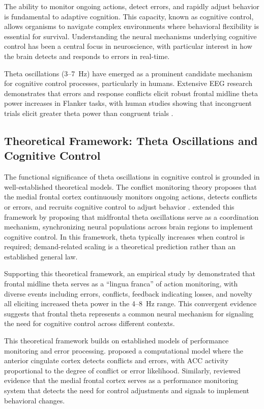 \documentclass[11pt]{article}
\begin{document}
The ability to monitor ongoing actions, detect errors, and rapidly adjust behavior is fundamental to adaptive cognition. This capacity, known as cognitive control, allows organisms to navigate complex environments where behavioral flexibility is essential for survival. Understanding the neural mechanisms underlying cognitive control has been a central focus in neuroscience, with particular interest in how the brain detects and responds to errors in real-time.

Theta oscillations (3--7~Hz) have emerged as a prominent candidate mechanism for cognitive control processes, particularly in humans. Extensive EEG research demonstrates that errors and response conflicts elicit robust frontal midline theta power increases in Flanker tasks, with human studies showing that incongruent trials elicit greater theta power than congruent trials \citep{linton2024behavioral}.

\subsection{Theoretical Framework: Theta Oscillations and Cognitive Control}

The functional significance of theta oscillations in cognitive control is grounded in well-established theoretical models. The conflict monitoring theory proposes that the medial frontal cortex continuously monitors ongoing actions, detects conflicts or errors, and recruits cognitive control to adjust behavior \citep{botvinick2001conflict, yeung2004neural}. \citet{cavanagh2014frontal} extended this framework by proposing that midfrontal theta oscillations serve as a coordination mechanism, synchronizing neural populations across brain regions to implement cognitive control. In this framework, theta typically increases when control is required; demand-related scaling is a theoretical prediction rather than an established general law.

Supporting this theoretical framework, an empirical study by \citet{cavanagh2012theta} demonstrated that frontal midline theta serves as a ``lingua franca'' of action monitoring, with diverse events including errors, conflicts, feedback indicating losses, and novelty all eliciting increased theta power in the 4--8~Hz range. This convergent evidence suggests that frontal theta represents a common neural mechanism for signaling the need for cognitive control across different contexts.

This theoretical framework builds on established models of performance monitoring and error processing. \citet{yeung2004neural} proposed a computational model where the anterior cingulate cortex detects conflicts and errors, with ACC activity proportional to the degree of conflict or error likelihood. Similarly, \citet{ridderinkhof2004role} reviewed evidence that the medial frontal cortex serves as a performance monitoring system that detects the need for control adjustments and signals to implement behavioral changes.
\end{document}
